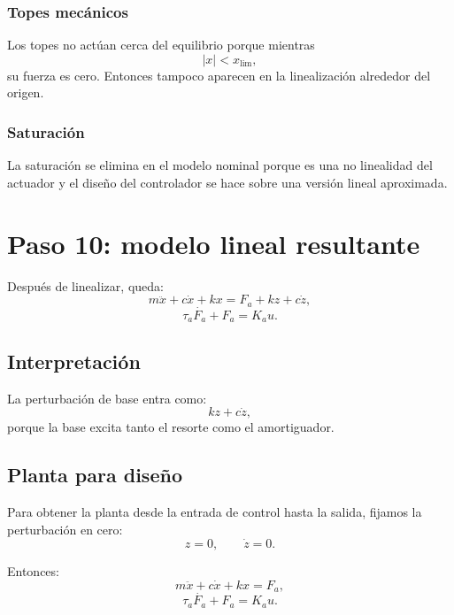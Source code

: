 \documentclass[11pt]{article}
\begin{document}
\subsubsection{Topes mec\'anicos}

Los topes no act\'uan cerca del equilibrio porque mientras
\[
|x|<x_{\text{lim}},
\]
su fuerza es cero. Entonces tampoco aparecen en la linealizaci\'on alrededor del origen.

\subsubsection{Saturaci\'on}

La saturaci\'on se elimina en el modelo nominal porque es una no linealidad del actuador y el dise\~no del controlador se hace sobre una versi\'on lineal aproximada.

\section{Paso 10: modelo lineal resultante}

Despu\'es de linealizar, queda:
\begin{equation}
m\ddot{x} + c\dot{x} + kx = F_a + kz + c\dot{z},
\label{eq:linear_with_dist}
\end{equation}
\begin{equation}
\tau_a\dot{F_a} + F_a = K_a u.
\label{eq:linear_act}
\end{equation}

\subsection{Interpretaci\'on}

La perturbaci\'on de base entra como:
\[
kz + c\dot{z},
\]
porque la base excita tanto el resorte como el amortiguador.

\subsection{Planta para dise\~no}

Para obtener la planta desde la entrada de control hasta la salida, fijamos la perturbaci\'on en cero:
\[
z=0,\qquad \dot{z}=0.
\]

Entonces:
\begin{equation}
m\ddot{x}+c\dot{x}+kx = F_a,
\label{eq:plant_mech}
\end{equation}
\begin{equation}
\tau_a\dot{F_a}+F_a = K_a u.
\label{eq:plant_act}
\end{equation}
\end{document}

